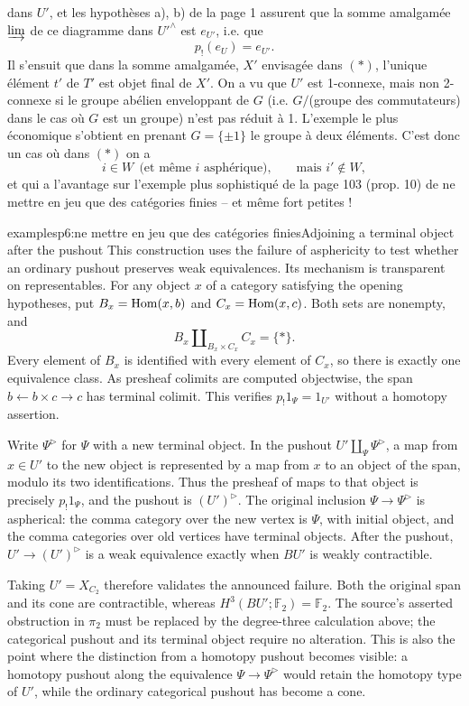 
dans $U'$, et les hypothèses a), b) de la page 1 assurent que la somme amalgamée $\varinjlim$ de ce diagramme dans $U'^{\wedge}$ est $e_{U'}$, i.e. que
\[ p_!(e_U) = e_{U'}. \]
Il s'ensuit que dans la somme amalgamée, $X'$ envisagée dans $(*)$, l'unique élément $t'$ de $T'$ est objet final de $X'$. On a vu que $U'$ est 1-connexe, mais non 2-connexe si le groupe abélien enveloppant de $G$ (i.e. $G/$(groupe des commutateurs) dans le cas où $G$ est un groupe) n'est pas réduit à 1. L'exemple le plus économique s'obtient en prenant $G = \{\pm 1\}$ le groupe à deux éléments. C'est donc un cas où dans $(*)$ on a
\[ i \in W \ \ \text{(et même $i$ asphérique),} \qquad \text{mais } i' \notin W, \]
et qui a l'avantage sur l'exemple plus sophistiqué de la page 103 (prop. 10) de ne mettre en jeu que des catégories finies -- et même fort petites !

\begin{dcomment}{examples}{p6:ne mettre en jeu que des catégories finies}{Adjoining a terminal object after the pushout}
This construction uses the failure of asphericity to test whether an ordinary pushout preserves weak equivalences. Its mechanism is transparent on representables. For any object $x$ of a category satisfying the opening hypotheses, put $B_x=\mathrm{Hom}(x,b)$ and $C_x=\mathrm{Hom}(x,c)$. Both sets are nonempty, and
\[
 B_x\amalg_{B_x\times C_x}C_x=\{*\}.
\]
Every element of $B_x$ is identified with every element of $C_x$, so there is exactly one equivalence class. As presheaf colimits are computed objectwise, the span $b\leftarrow b\times c\to c$ has terminal colimit. This verifies $p_!1_\Psi=1_{U'}$ without a homotopy assertion.

Write $\Psi^{\triangleright}$ for $\Psi$ with a new terminal object. In the pushout $U'\amalg_\Psi\Psi^{\triangleright}$, a map from $x\in U'$ to the new object is represented by a map from $x$ to an object of the span, modulo its two identifications. Thus the presheaf of maps to that object is precisely $p_!1_\Psi$, and the pushout is $(U')^{\triangleright}$. The original inclusion $\Psi\to\Psi^{\triangleright}$ is aspherical: the comma category over the new vertex is $\Psi$, with initial object, and the comma categories over old vertices have terminal objects. After the pushout, $U'\to(U')^{\triangleright}$ is a weak equivalence exactly when $BU'$ is weakly contractible.

Taking $U'=X_{C_2}$ therefore validates the announced failure. Both the original span and its cone are contractible, whereas $H^3(BU';\mathbb F_2)=\mathbb F_2$. The source's asserted obstruction in $\pi_2$ must be replaced by the degree-three calculation above; the categorical pushout and its terminal object require no alteration. This is also the point where the distinction from a homotopy pushout becomes visible: a homotopy pushout along the equivalence $\Psi\to\Psi^{\triangleright}$ would retain the homotopy type of $U'$, while the ordinary categorical pushout has become a cone.
\end{dcomment}


